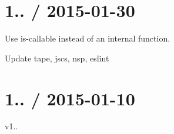 \section*{1.. / 2015-\/01-\/30 }


\begin{DoxyItemize}
\item Use {\ttfamily is-\/callable} instead of an internal function.
\item Update {\ttfamily tape}, {\ttfamily jscs}, {\ttfamily nsp}, {\ttfamily eslint}
\end{DoxyItemize}

\section*{1.. / 2015-\/01-\/10 }


\begin{DoxyItemize}
\item v1.. 
\end{DoxyItemize}